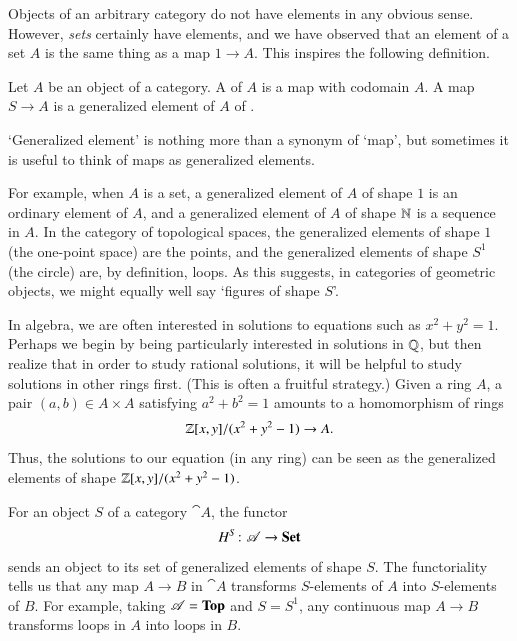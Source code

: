 Objects of an arbitrary category do not have elements in any obvious sense.
However, \emph{sets} certainly have elements, and we have observed that an
element of a set $A$ is the same thing as a map $1 \to A$.  This inspires
the following definition.

\begin{defn}
\label{defn:gen-elt}
Let $A$ be an object of a category.  A  of $A$ is a map with codomain $A$.  A map $S \to A$ is a
generalized element of $A$ of .
\end{defn}

`Generalized element' is nothing more than a synonym of `map', but
sometimes it is useful to think of maps as generalized elements.

For example, when $A$ is a set, a generalized element of $A$ of shape $1$
is an ordinary element of $A$, and a generalized element of $A$ of shape
$\mathbb{N}$ is a sequence%
%
%
in $A$.  In the category of topological spaces, the generalized elements of
shape $1$ (the one-point space) are the points, and the generalized
elements of shape $S^1$ (the circle) are, by definition, loops.%
%
%
As this suggests, in categories of geometric objects, we might equally well
say `figures of shape $S$'.

In algebra,%
%
%
we are often interested in solutions to equations such as $x^2 + y^2 = 1$.
Perhaps we begin by being particularly interested in solutions in
$\mathbb{Q}$, but then realize that in order to study rational solutions,
it will be helpful to study solutions in other rings first.  (This is often
a fruitful strategy.)  Given a ring $A$, a pair $(a, b) \in A \times A$
satisfying $a^2 + b^2 = 1$ amounts to a homomorphism of rings
\[
\integers[x, y]/(x^2 + y^2 - 1) \to A.
%
\index{algebraic geometry}
%
\]
Thus, the solutions to our equation (in any ring) can be seen as the
generalized elements of shape $ \mathbb{Z}[x, y]/(x^2 + y^2 - 1)$.

For an object $S$ of a category $\cat{A}$, the functor
\[
\h^S\from \cat{A} \to \Set
\]
sends an object to its set of generalized elements of shape $S$.  The
functoriality tells us that any map $A \to B$ in $\cat{A}$ transforms
$S$-elements of $A$ into $S$-elements of $B$.  For example, taking $\mathscr{A}
= \mathbf{Top}$ and $S = S^1$, any continuous map $A \to B$ transforms loops in $A$
into loops in $B$.%
%
%


